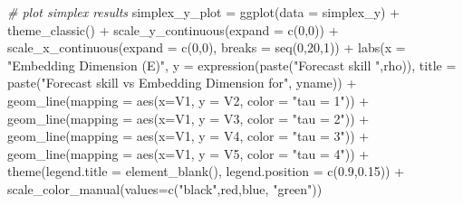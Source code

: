 \documentclass[
]{article}
\newenvironment{Shaded}{\begin{snugshade}}{\end{snugshade}}
\newcommand{\AttributeTok}[1]{\textcolor[rgb]{0.77,0.63,0.00}{#1}}
\newcommand{\CommentTok}[1]{\textcolor[rgb]{0.56,0.35,0.01}{\textit{#1}}}
\newcommand{\DecValTok}[1]{\textcolor[rgb]{0.00,0.00,0.81}{#1}}
\newcommand{\FloatTok}[1]{\textcolor[rgb]{0.00,0.00,0.81}{#1}}
\newcommand{\FunctionTok}[1]{\textcolor[rgb]{0.00,0.00,0.00}{#1}}
\newcommand{\NormalTok}[1]{#1}
\newcommand{\OtherTok}[1]{\textcolor[rgb]{0.56,0.35,0.01}{#1}}
\newcommand{\SpecialCharTok}[1]{\textcolor[rgb]{0.00,0.00,0.00}{#1}}
\newcommand{\StringTok}[1]{\textcolor[rgb]{0.31,0.60,0.02}{#1}}
\begin{document}
\begin{Shaded}
\begin{Highlighting}[]
\CommentTok{\# plot simplex results}
\NormalTok{simplex\_y\_plot }\OtherTok{=} \FunctionTok{ggplot}\NormalTok{(}\AttributeTok{data =}\NormalTok{ simplex\_y) }\SpecialCharTok{+} \FunctionTok{theme\_classic}\NormalTok{() }\SpecialCharTok{+} \FunctionTok{scale\_y\_continuous}\NormalTok{(}\AttributeTok{expand =} \FunctionTok{c}\NormalTok{(}\DecValTok{0}\NormalTok{,}\DecValTok{0}\NormalTok{)) }\SpecialCharTok{+} \FunctionTok{scale\_x\_continuous}\NormalTok{(}\AttributeTok{expand =} \FunctionTok{c}\NormalTok{(}\DecValTok{0}\NormalTok{,}\DecValTok{0}\NormalTok{), }\AttributeTok{breaks =} \FunctionTok{seq}\NormalTok{(}\DecValTok{0}\NormalTok{,}\DecValTok{20}\NormalTok{,}\DecValTok{1}\NormalTok{)) }\SpecialCharTok{+}
  \FunctionTok{labs}\NormalTok{(}\AttributeTok{x =} \StringTok{"Embedding Dimension (E)"}\NormalTok{, }\AttributeTok{y =} \FunctionTok{expression}\NormalTok{(}\FunctionTok{paste}\NormalTok{(}\StringTok{"Forecast skill "}\NormalTok{,rho)), }\AttributeTok{title =} \FunctionTok{paste}\NormalTok{(}\StringTok{"Forecast skill vs Embedding Dimension for"}\NormalTok{, yname)) }\SpecialCharTok{+}
  \FunctionTok{geom\_line}\NormalTok{(}\AttributeTok{mapping =} \FunctionTok{aes}\NormalTok{(}\AttributeTok{x=}\NormalTok{V1, }\AttributeTok{y =}\NormalTok{ V2, }\AttributeTok{color =} \StringTok{"tau = 1"}\NormalTok{)) }\SpecialCharTok{+}
  \FunctionTok{geom\_line}\NormalTok{(}\AttributeTok{mapping =} \FunctionTok{aes}\NormalTok{(}\AttributeTok{x=}\NormalTok{V1, }\AttributeTok{y =}\NormalTok{ V3, }\AttributeTok{color =} \StringTok{"tau = 2"}\NormalTok{)) }\SpecialCharTok{+}
  \FunctionTok{geom\_line}\NormalTok{(}\AttributeTok{mapping =} \FunctionTok{aes}\NormalTok{(}\AttributeTok{x=}\NormalTok{V1, }\AttributeTok{y =}\NormalTok{ V4, }\AttributeTok{color =} \StringTok{"tau = 3"}\NormalTok{)) }\SpecialCharTok{+}
  \FunctionTok{geom\_line}\NormalTok{(}\AttributeTok{mapping =} \FunctionTok{aes}\NormalTok{(}\AttributeTok{x=}\NormalTok{V1, }\AttributeTok{y =}\NormalTok{ V5, }\AttributeTok{color =} \StringTok{"tau = 4"}\NormalTok{)) }\SpecialCharTok{+}
  \FunctionTok{theme}\NormalTok{(}\AttributeTok{legend.title =} \FunctionTok{element\_blank}\NormalTok{(), }\AttributeTok{legend.position =} \FunctionTok{c}\NormalTok{(}\FloatTok{0.9}\NormalTok{,}\FloatTok{0.15}\NormalTok{)) }\SpecialCharTok{+}
  \FunctionTok{scale\_color\_manual}\NormalTok{(}\AttributeTok{values=}\FunctionTok{c}\NormalTok{(}\StringTok{"black"}\NormalTok{,}\StringTok{\textquotesingle{}red\textquotesingle{}}\NormalTok{,}\StringTok{\textquotesingle{}blue\textquotesingle{}}\NormalTok{, }\StringTok{"green"}\NormalTok{))}
\end{Highlighting}
\end{Shaded}
\end{document}
